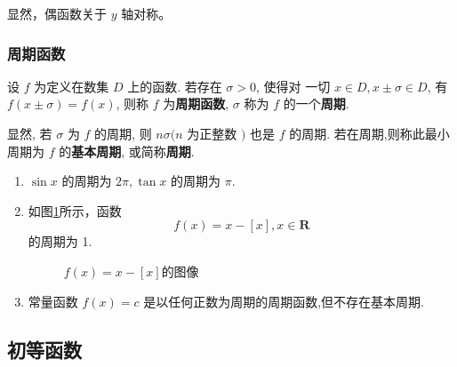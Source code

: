 \documentclass[lang=cn,newtx,10pt,scheme=chinese]{elegantbook}
\begin{document}
显然，偶函数关于 $y$ 轴对称。


\subsubsection{周期函数}

\begin{definition}[周期函数]
    设 $f$ 为定义在数集 $D$ 上的函数. 若存在 $\sigma>0$, 使得对 一切 $x\in D, x \pm \sigma \in D$, 有 $f(x \pm \sigma)=f(x)$, 则称 $f$ 为\textcolor{third}{\bf 周期函数}, $\sigma$ 称为 $f$ 的一个\textcolor{third}{\bf 周期}. 
\end{definition}

显然, 若 $\sigma$ 为 $f$ 的周期, 则 $n \sigma(n$ 为正整数 $)$ 也是 $f$ 的周期. 若在周期,则称此最小周期为 $f$ 的\textcolor{third}{\bf 基本周期}, 或简称\textcolor{third}{\bf 周期}.

\begin{exercise}

    \begin{enumerate}
        \item $\sin x$ 的周期为 $2 \pi, \tan x$ 的周期为 $\pi$.
    
        \item 如图\ref{fig:f(x)=x-[x]的图像}所示，函数
        $$
        f(x)=x-[x], x \in \mathbf{R}
        $$
        的周期为 1. 

\begin{figure}[!h]
\centering
{}
\caption{$f(x)=x-[x]$的图像}
\label{fig:f(x)=x-[x]的图像}
\end{figure}

\item 常量函数 $f(x)=c$ 是以任何正数为周期的周期函数,但不存在基本周期.
        \end{enumerate}
\end{exercise}

\subsection{初等函数}
\end{document}
